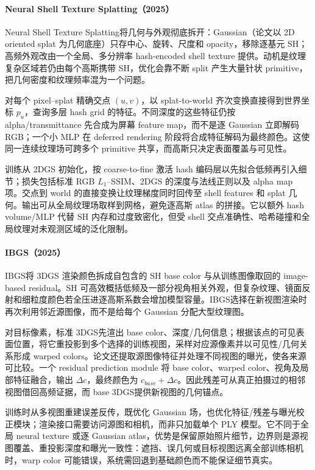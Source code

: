 \paragraph{Neural Shell Texture Splatting（2025）\cite{2507_20200}}
Neural Shell Texture Splatting将几何与外观彻底拆开：Gaussian（论文以 2D oriented splat 为几何底座）只存中心、旋转、尺度和 opacity，移除逐基元 SH；高频外观改由一个全局、多分辨率 hash-encoded shell texture 提供。动机是纹理复杂区域若仍由每个高斯携带 SH，优化会靠不断 split 产生大量针状 primitive，把几何密度和纹理频率混为一个问题。

对每个 pixel--splat 精确交点 $(u,v)$，以 splat-to-world 齐次变换直接得到世界坐标 $p_u$，查询多层 hash grid 的特征。不同深度的这些特征仍按 alpha/transmittance 先合成为屏幕 feature map，而不是逐 Gaussian 立即解码 RGB；一个小 MLP 在 deferred rendering 阶段将合成特征解码为最终颜色。这使同一连续纹理场可跨多个 primitive 共享，而高斯只决定表面覆盖与可见性。

训练从 2DGS 初始化，按 coarse-to-fine 激活 hash 编码层以先拟合低频再引入细节；损失包括标准 RGB $L_1$--SSIM、2DGS 的深度与法线正则以及 alpha map 项。交点到 world 的直接变换让纹理梯度同时回传至 shell features 和 splat 几何。输出可从全局纹理场取样到网格，避免逐高斯 atlas 的拼接。它以额外 hash volume/MLP 代替 SH 内存和过度致密化，但受 shell 交点准确性、哈希碰撞和全局纹理对未观测区域的泛化限制。

\paragraph{IBGS（2025）\cite{2511_14357}}
IBGS将 3DGS 渲染颜色拆成自包含的 SH base color 与从训练图像取回的 image-based residual。SH 可高效概括低频及一部分视角相关外观，但复杂纹理、镜面反射和细粒度颜色若全压进逐高斯系数会增加模型容量。IBGS选择在新视图渲染时再次利用邻近源图像，而不是给每个 Gaussian 分配大型纹理图。

对目标像素，标准 3DGS先渲出 base color、深度/几何信息；根据该点的可见表面位置，将它重投影到多个选择的训练视图，采样对应源像素并以可见性/几何关系形成 warped colors。论文还提取源图像特征并处理不同视图的曝光，使各来源可比较。一个 residual prediction module 将 base color、warped color、视角及局部特征融合，输出 $\Delta c$，最终颜色为 $c_{base}+\Delta c$。因此残差可从真正拍摄过的相邻视图借回高频证据，而 base 3DGS提供新视图的几何锚点。

训练时从多视图重建误差反传，既优化 Gaussian 场，也优化特征/残差与曝光校正模块；渲染接口需要访问源图和相机，而非只加载单个 PLY 模型。它不同于全局 neural texture 或逐 Gaussian atlas，优势是保留原始照片细节，边界则是源视图覆盖、重投影深度和曝光一致性：遮挡、误几何或目标视图远离全部训练相机时，warp color 可能错误，系统需回退到基础颜色而不能保证细节真实。

